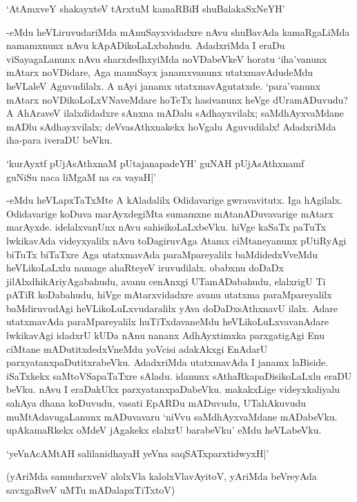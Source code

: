 \begin{shloka}
`AtAmxveY shakayxteV tArxtuM kamaRBiH shuBalakaSxNeYH'
\end{shloka}

-eMdu heVLiruvudariMda mAnuSayxvidadxre nAvu shuBavAda kamaRgaLiMda namamxnunx nAvu kApADikoLaLxbahudu. AdadxriMda I eraDu viSayagaLanunx nAvu sharxdedhxyiMda noVDabeVkeV horatu `iha'vanunx mAtarx noVDidare, Aga manuSayx janamxvanunx utatxmavAdudeMdu heVLaleV Aguvudilalx. A nAyi janamx utatxmavAgutatxde. `para'vanunx mAtarx noVDikoLoLxVNaveMdare hoTeTx hasivanunx heVge dUramADuvudu? A AhAraveV ilalxdidadxre sAnxna mADalu sAdhayxvilalx; saMdhAyxvaMdane mADlu sAdhayxvilalx; deVvasAthxnakekx hoVgalu Aguvudilalx! AdadxriMda iha-para iveraDU beVku.

\begin{shloka}
`kurAyxtf pUjAsAthxnaM pUtajanapadeYH' guNAH pUjAsAthxnamf\\
guNiSu naca liMgaM na ca vayaH|'
\end{shloka} 

-eMdu heVLapxTaTxMte A kAladalilx Odidavarige gwravavitutx. Iga hAgilalx. Odidavarige koDuva marAyxdegiMta sumamxne mAtanADuvavarige mAtarx marAyxde. idelalxvanUnx nAvu sahisikoLaLxbeVku. hiVge kaSaTx paTuTx lwkikavAda videyxyalilx nAvu toDagiruvAga Atamx ciMtaneyanunx pUtiRyAgi biTuTx biTaTxre Aga utatxmavAda paraMpareyalilx baMdidedxVveMdu heVLikoLaLxlu namage ahaRteyeV iruvudilalx. obabxnu doDaDx jilAlxdhikAriyAgabahudu, avanu cenAnxgi UTamADabahudu, elalxrigU Ti pATiR koDabahudu, hiVge mAtarxvidadxre avanu utatxma paraMpareyalilx baMdiruvudAgi heVLikoLuLxvudaralilx yAva doDaDxsAthxnavU ilalx. Adare utatxmavAda paraMpareyalilx huTiTxdavaneMdu heVLikoLuLxvavanAdare lwkikavAgi idadxrU kUDa nAnu nananx AdhAyxtimxka parxgatigAgi Enu ciMtane mADutitxdedxVneMdu yoVcisi adakAkxgi EnAdarU parxyatanxpaDutitxrabeVku. AdadxriMda utatxmavAda I janamx laBiside. iSaTxkekx saMtoVSapaTaTxre sAladu. idanunx sAthaRkapaDisikoLaLxlu eraDU beVku. nAvu I eraDakUkx parxyatanxpaDabeVku. makakxLige videyxkaliyalu sahAya dhana koDuvudu, vasati EpARDu mADuvudu, U{{Ta}}hAkuvudu muMtAdavugaLanunx mADuvavaru `niVvu saMdhAyxvaMdane mADabeVku. upAkamaRkekx oMdeV jAgakekx elalxrU barabeVku' eMdu heVLabeVku.

\begin{shloka}
`yeVnAcAMtAH salilanidhayaH yeVna saqSATxparxtidwyxH|'
\end{shloka}

(yAriMda samudarxveV alolxVla kalolxVlavAyitoV, yAriMda beVreyAda savxgaRveV uMTu mADalapxTiTxtoV)


